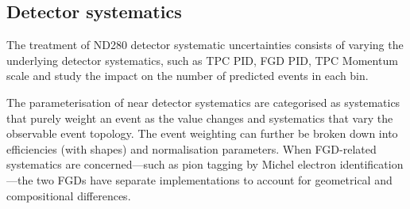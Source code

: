 \subsection{Detector systematics}
\label{subsec:syst_nd280}
The treatment of ND280 detector systematic uncertainties consists of varying the underlying detector systematics, such as TPC PID, FGD PID, TPC Momentum scale and study the impact on the number of predicted events in each \pmu \cosmu bin. 

The parameterisation of near detector systematics are categorised as systematics that purely weight an event as the value changes and systematics that vary the observable event topology. The event weighting can further be broken down into efficiencies (with shapes) and normalisation parameters. When FGD-related systematics are concerned---such as pion tagging by Michel electron identification---the two FGDs have separate implementations to account for geometrical and compositional differences.

